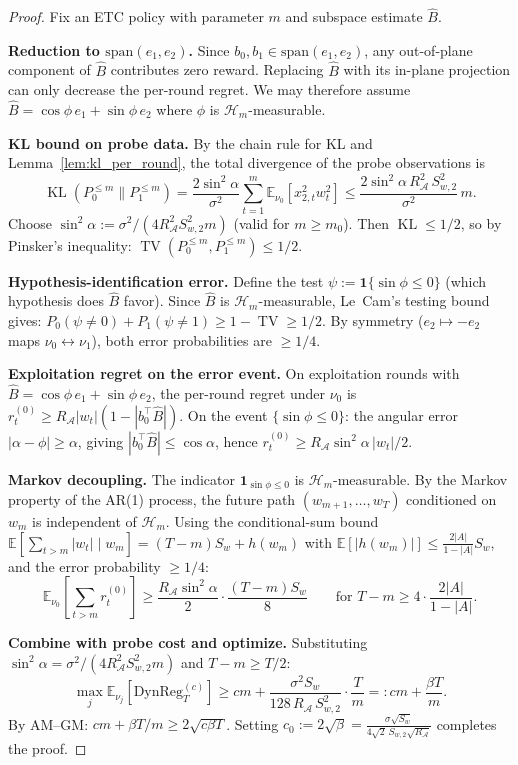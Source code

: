 \documentclass{article}
\newcommand{\E}{\mathbb{E}}
\newcommand{\cA}{\mathcal{A}}
\newcommand{\cH}{\mathcal{H}}
\newcommand{\DynReg}{\mathrm{DynReg}}
\newcommand{\Span}{\mathrm{span}}
\DeclareMathOperator{\KL}{KL}
\DeclareMathOperator{\TV}{TV}
\begin{document}
\begin{proof}
Fix an ETC policy with parameter $m$ and subspace estimate $\hat{B}$.

\textbf{Reduction to $\Span(e_1,e_2)$.}
Since $b_0, b_1 \in \Span(e_1,e_2)$, any out-of-plane component of $\hat{B}$ contributes zero reward.  Replacing $\hat{B}$ with its in-plane projection can only decrease the per-round regret.  We may therefore assume $\hat{B} = \cos\phi\,e_1 + \sin\phi\,e_2$ where $\phi$ is $\cH_m$-measurable.

\textbf{KL bound on probe data.}
By the chain rule for KL and Lemma~\ref{lem:kl_per_round}, the total divergence of the probe observations is
\[
  \KL(P_0^{\le m}\|P_1^{\le m})
  = \frac{2\sin^2\!\alpha}{\sigma^2}\sum_{t=1}^m \E_{\nu_0}[x_{2,t}^2 w_t^2]
  \le \frac{2\sin^2\!\alpha\,R_{\cA}^2\,S_{w,2}^2}{\sigma^2}\,m.
\]
Choose $\sin^2\!\alpha := \sigma^2/(4R_{\cA}^2 S_{w,2}^2 m)$ (valid for $m \ge m_0$).  Then $\KL \le 1/2$, so by Pinsker's inequality: $\TV(P_0^{\le m}, P_1^{\le m}) \le 1/2$.

\textbf{Hypothesis-identification error.}
Define the test $\psi := \mathbf{1}\{\sin\phi \le 0\}$ (which hypothesis does $\hat{B}$ favor).  Since $\hat{B}$ is $\cH_m$-measurable, Le~Cam's testing bound gives:
$P_0(\psi \ne 0) + P_1(\psi \ne 1) \ge 1 - \TV \ge 1/2$.
By symmetry ($e_2 \mapsto -e_2$ maps $\nu_0 \leftrightarrow \nu_1$), both error probabilities are $\ge 1/4$.

\textbf{Exploitation regret on the error event.}
On exploitation rounds with $\hat{B} = \cos\phi\,e_1 + \sin\phi\,e_2$, the per-round regret under $\nu_0$ is $r_t^{(0)} \ge R_{\cA}|w_t|(1-|b_0^\top\hat{B}|)$.
On the event $\{\sin\phi \le 0\}$: the angular error $|\alpha-\phi| \ge \alpha$, giving $|b_0^\top\hat{B}| \le \cos\alpha$, hence
$r_t^{(0)} \ge R_{\cA}\sin^2\!\alpha\,|w_t|/2$.

\textbf{Markov decoupling.}
The indicator $\mathbf{1}_{\sin\phi\le 0}$ is $\cH_m$-measurable.  By the Markov property of the AR(1) process, the future path $(w_{m+1},\ldots,w_T)$ conditioned on $w_m$ is independent of $\cH_m$.
Using the conditional-sum bound $\E[\sum_{t>m}|w_t|\mid w_m] = (T-m)S_w + h(w_m)$ with $\E[|h(w_m)|] \le \frac{2|A|}{1-|A|}S_w$, and the error probability $\ge 1/4$:
\[
\E_{\nu_0}\!\left[\sum_{t>m} r_t^{(0)}\right]
\ge \frac{R_{\cA}\sin^2\!\alpha}{2}\cdot\frac{(T-m)S_w}{8}
\qquad\text{for } T-m \ge 4\cdot\frac{2|A|}{1-|A|}.
\]

\textbf{Combine with probe cost and optimize.}
Substituting $\sin^2\!\alpha = \sigma^2/(4R_{\cA}^2 S_{w,2}^2 m)$ and $T-m \ge T/2$:
\[
\max_j \E_{\nu_j}[\DynReg_T^{(c)}]
\ge cm + \frac{\sigma^2 S_w}{128\,R_{\cA}\,S_{w,2}^2}\cdot\frac{T}{m}
=: cm + \frac{\beta T}{m}.
\]
By AM--GM: $cm + \beta T/m \ge 2\sqrt{c\beta T}$.
Setting $c_0 := 2\sqrt{\beta} = \frac{\sigma\sqrt{S_w}}{4\sqrt{2}\,S_{w,2}\sqrt{R_{\cA}}}$ completes the proof.
\end{proof}
\end{document}
